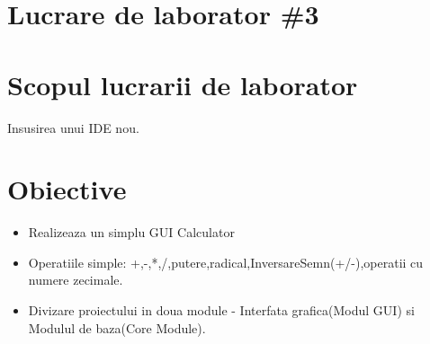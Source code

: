 \section*{Lucrare de laborator \#3}

\section{Scopul lucrarii de laborator}
Insusirea unui IDE nou.
\section{Obiective}
\begin{itemize}
\item Realizeaza un simplu GUI Calculator
\item Operatiile simple: +,-,*,/,putere,radical,InversareSemn(+/-),operatii cu numere zecimale.
\item Divizare proiectului in doua module - Interfata grafica(Modul GUI) si Modulul de baza(Core Module).
\end{itemize}

\clearpage